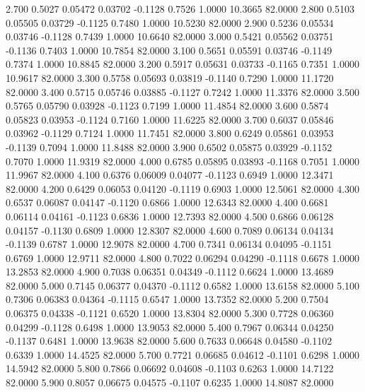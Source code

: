    2.700   0.5027   0.05472   0.03702  -0.1128   0.7526   1.0000  10.3665  82.0000
   2.800   0.5103   0.05505   0.03729  -0.1125   0.7480   1.0000  10.5230  82.0000
   2.900   0.5236   0.05534   0.03746  -0.1128   0.7439   1.0000  10.6640  82.0000
   3.000   0.5421   0.05562   0.03751  -0.1136   0.7403   1.0000  10.7854  82.0000
   3.100   0.5651   0.05591   0.03746  -0.1149   0.7374   1.0000  10.8845  82.0000
   3.200   0.5917   0.05631   0.03733  -0.1165   0.7351   1.0000  10.9617  82.0000
   3.300   0.5758   0.05693   0.03819  -0.1140   0.7290   1.0000  11.1720  82.0000
   3.400   0.5715   0.05746   0.03885  -0.1127   0.7242   1.0000  11.3376  82.0000
   3.500   0.5765   0.05790   0.03928  -0.1123   0.7199   1.0000  11.4854  82.0000
   3.600   0.5874   0.05823   0.03953  -0.1124   0.7160   1.0000  11.6225  82.0000
   3.700   0.6037   0.05846   0.03962  -0.1129   0.7124   1.0000  11.7451  82.0000
   3.800   0.6249   0.05861   0.03953  -0.1139   0.7094   1.0000  11.8488  82.0000
   3.900   0.6502   0.05875   0.03929  -0.1152   0.7070   1.0000  11.9319  82.0000
   4.000   0.6785   0.05895   0.03893  -0.1168   0.7051   1.0000  11.9967  82.0000
   4.100   0.6376   0.06009   0.04077  -0.1123   0.6949   1.0000  12.3471  82.0000
   4.200   0.6429   0.06053   0.04120  -0.1119   0.6903   1.0000  12.5061  82.0000
   4.300   0.6537   0.06087   0.04147  -0.1120   0.6866   1.0000  12.6343  82.0000
   4.400   0.6681   0.06114   0.04161  -0.1123   0.6836   1.0000  12.7393  82.0000
   4.500   0.6866   0.06128   0.04157  -0.1130   0.6809   1.0000  12.8307  82.0000
   4.600   0.7089   0.06134   0.04134  -0.1139   0.6787   1.0000  12.9078  82.0000
   4.700   0.7341   0.06134   0.04095  -0.1151   0.6769   1.0000  12.9711  82.0000
   4.800   0.7022   0.06294   0.04290  -0.1118   0.6678   1.0000  13.2853  82.0000
   4.900   0.7038   0.06351   0.04349  -0.1112   0.6624   1.0000  13.4689  82.0000
   5.000   0.7145   0.06377   0.04370  -0.1112   0.6582   1.0000  13.6158  82.0000
   5.100   0.7306   0.06383   0.04364  -0.1115   0.6547   1.0000  13.7352  82.0000
   5.200   0.7504   0.06375   0.04338  -0.1121   0.6520   1.0000  13.8304  82.0000
   5.300   0.7728   0.06360   0.04299  -0.1128   0.6498   1.0000  13.9053  82.0000
   5.400   0.7967   0.06344   0.04250  -0.1137   0.6481   1.0000  13.9638  82.0000
   5.600   0.7633   0.06648   0.04580  -0.1102   0.6339   1.0000  14.4525  82.0000
   5.700   0.7721   0.06685   0.04612  -0.1101   0.6298   1.0000  14.5942  82.0000
   5.800   0.7866   0.06692   0.04608  -0.1103   0.6263   1.0000  14.7122  82.0000
   5.900   0.8057   0.06675   0.04575  -0.1107   0.6235   1.0000  14.8087  82.0000
